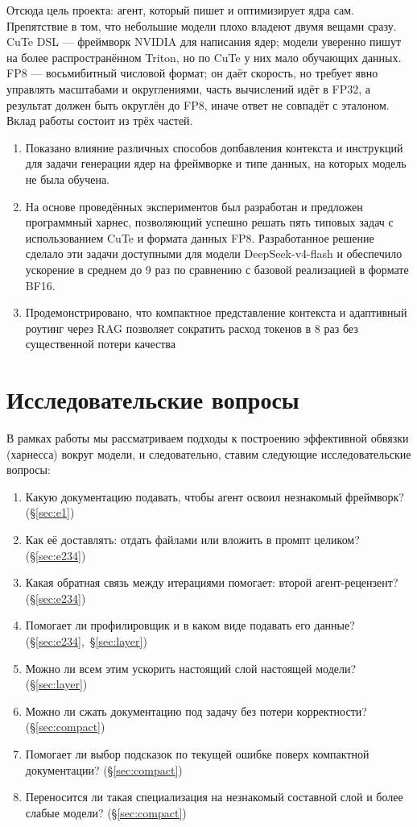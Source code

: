 \documentclass[10pt,a4paper]{article}
\begin{document}
Отсюда цель проекта: агент, который пишет и оптимизирует ядра сам. Препятствие в том, что
небольшие модели плохо владеют двумя вещами сразу. CuTe DSL --- фреймворк NVIDIA для
написания ядер; модели уверенно пишут на более распространённом Triton, но по CuTe у них
мало обучающих данных. FP8 --- восьмибитный числовой формат; он даёт скорость, но требует
явно управлять масштабами и округлениями, часть вычислений идёт в FP32, а результат должен
быть округлён до FP8, иначе ответ не совпадёт с эталоном.
Вклад работы состоит из трёх частей.
\begin{enumerate}
\item Показано влияние различных способов допбавления контекста и инструкций для задачи генерации ядер на фреймворке и типе данных, на которых модель не была обучена.
\item На основе проведённых экспериментов был разработан и предложен программный харнес, позволяющий успешно решать пять типовых задач с использованием CuTe и формата данных FP8. Разработанное решение сделало эти задачи доступными для  модели DeepSeek-v4-flash и обеспечило ускорение в среднем до 9 раз по сравнению с базовой реализацией в формате BF16.
\item Продемонстрировано, что компактное представление контекста и адаптивный роутинг через RAG позволяет сократить расход токенов в 8 раз без существенной потери качества
\end{enumerate}

\section{Исследовательские вопросы}


В рамках работы мы рассматриваем подходы к построению эффективной обвязки (харнесса) вокруг модели, и следовательно, ставим следующие исследовательские вопросы:
\begin{enumerate}[label=Q\arabic*.]
\item Какую документацию подавать, чтобы агент освоил незнакомый фреймворк? (§\ref{sec:e1})
\item Как её доставлять: отдать файлами или вложить в промпт целиком? (§\ref{sec:e234})
\item Какая обратная связь между итерациями помогает: второй агент-рецензент? (§\ref{sec:e234})
\item Помогает ли профилировщик и в каком виде подавать его данные? (§\ref{sec:e234},~§\ref{sec:layer})
\item Можно ли всем этим ускорить настоящий слой настоящей модели? (§\ref{sec:layer})
\item Можно ли сжать документацию под задачу без потери корректности? (§\ref{sec:compact})
\item Помогает ли выбор подсказок по текущей ошибке поверх компактной документации? (§\ref{sec:compact})
\item Переносится ли такая специализация на незнакомый составной слой и более слабые модели? (§\ref{sec:compact})
\end{enumerate}
\end{document}
